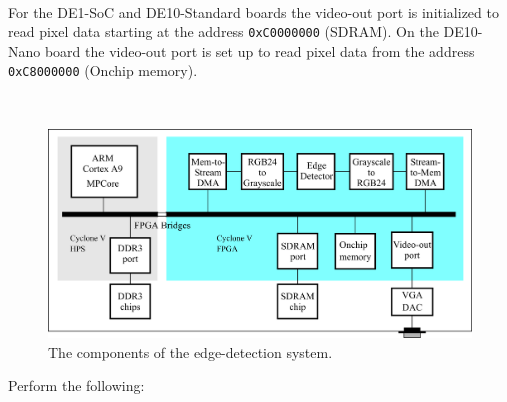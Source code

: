 \documentclass[epsfig,10pt,fullpage]{article}
\begin{document}
~\\
\noindent
For the DE1-SoC and DE10-Standard boards the video-out port is initialized to read pixel 
data starting at the address \texttt{0xC0000000} (SDRAM). On the DE10-Nano board the video-out
port is set up to read pixel data from the address \texttt{0xC8000000} (Onchip memory).

~\\
\begin{figure}[H]
   \begin{center}
       \includegraphics[scale = 1.0]{figures/edge_detect_system.png}
   \end{center}
   \caption{The components of the edge-detection system.}
	\label{fig:edge_detect_system}
\end{figure}

\newpage
\noindent Perform the following:
\end{document}
